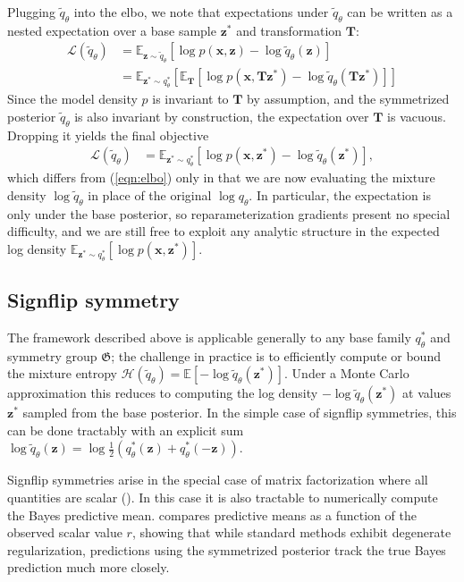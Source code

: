 \documentclass{article}
\newcommand{\E}{\mathbb{E}}
\newcommand{\G}{\mathfrak{G}}
\renewcommand{\v}[1]{\mathbf{#1}}
\newcommand{\elbo}{{\sc elbo}}
\begin{document}
Plugging $\tilde{q}_\theta$ into the \elbo, we note that
expectations under $\tilde{q}_\theta$ can be written as a nested expectation
over a base sample $\v{z}^*$ and transformation $\v{T}$:
\begin{align*}
\mathcal{L}(\tilde{q}_\theta) &= \E_{\v{z}\sim \tilde{q}_\theta}\left[\log p(\v{x}, \v{z}) - \log \tilde{q}_\theta(\v{z})\right]\\
&= \E_{\v{z}^*\sim q^*_\theta}\left[\E_\v{T}\left[\log p(\v{x}, \v{T}\v{z}^*) -
  \log \tilde{q}_\theta(\v{T}\v{z}^*)\right]\right]
\end{align*}
Since the model density $p$ is invariant to $\v{T}$ by assumption, and
the symmetrized posterior $\tilde{q}_\theta$ is also
invariant by construction, the expectation over $\v{T}$ is vacuous. Dropping it yields the
final objective
\begin{align}
\mathcal{L}(\tilde{q}_\theta) &= \E_{\v{z}^*\sim q^*_\theta}\left[\log p(\v{x}, \v{z}^*) - \log \tilde{q}_\theta(\v{z}^*)\right]\label{eqn:symmetrized_elbo},
\end{align}
which differs from (\ref{eqn:elbo}) only in that we are now
evaluating the mixture density $\log \tilde{q}_\theta$ in place of the
original $\log q_\theta$. In particular, the expectation is
only under the base posterior, so reparameterization
gradients present no special difficulty, and we are still free to
exploit any analytic structure in the expected log density $\E_{\v{z}^*\sim q^*_\theta}\left[\log p(\v{x}, \v{z}^*)\right]$. 

\subsection{Signflip symmetry}

The framework described above is applicable generally to any base
family $q^*_\theta$ and symmetry group $\G$; the challenge in practice is to efficiently
compute or bound the mixture entropy $\mathcal{H}(\tilde{q}_\theta) =
\E[-\log \tilde{q}_\theta(\v{z}^*)]$. Under a Monte Carlo approximation this
reduces to computing the log density $-\log \tilde{q}_\theta(\v{z}^*)$
at values $\v{z}^*$ sampled from the base posterior. In the simple case of signflip
symmetries, this can be done tractably with an explicit sum $\log
\tilde{q}_\theta(\v{z}) = \log \frac{1}{2}\left(q_\theta^*(\v{z}) + q_\theta^*(-\v{z})\right)$.

Signflip symmetries arise in the special case of matrix
factorization where all quantities are scalar
(). In this case it is also tractable to
numerically compute the Bayes predictive mean. 
compares predictive means as a function of the observed scalar value $r$, showing
that while standard methods exhibit degenerate regularization,
predictions using the symmetrized posterior track the true Bayes
prediction much more closely. 
\end{document}
